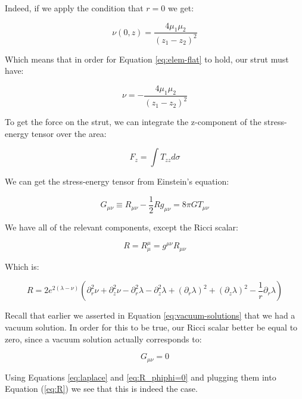 \documentclass{article}
\begin{document}
Indeed, if we apply the condition that $r=0$ we get:

\begin{equation}
\nu (0,z)=\frac{4\mu_{1}\mu_{2}}{\left(z_{1}-z_{2}\right)^{2}}\label{eq:nu_r=0}
\end{equation}

Which means that in order for Equation \eqref{eq:elem-flat} to hold, our strut must have:

\begin{equation}
\nu=-\frac{4\mu_{1}\mu_{2}}{\left(z_{1}-z_{2}\right)^{2}}
\end{equation}

To get the force on the strut, we can integrate the z-component of the stress-energy tensor over the area:

\begin{equation}
F_{z}=\int T_{zz}d\sigma
\end{equation}

We can get the stress-energy tensor from Einstein's equation:

\begin{equation}
G_{\mu\nu}\equiv R_{\mu\nu}-\frac{1}{2}Rg_{\mu\nu}=8\pi GT_{\mu\nu}\label{eq:einstein}
\end{equation}

We have all of the relevant components, except the Ricci scalar:

\begin{equation}
R=R_{\mu}^{\mu}=g^{\mu\nu}R_{\mu\nu}
\end{equation}

Which is:

\begin{equation}
R=2e^{2\left(\lambda-\nu\right)}\left(\partial^{2}_{r}\nu+\partial^{2}_{z}\nu-\partial^{2}_{r}\lambda-\partial^{2}_{z}\lambda+\left(\partial_{r}\lambda\right)^{2}+\left(\partial_{z}\lambda\right)^{2}-\frac{1}{r}\partial_{r}\lambda\right)\label{eq:R}
\end{equation}

Recall that earlier we asserted in Equation \eqref{eq:vacuum-solutions} that we had a vacuum solution. In order for this to be true, our Ricci scalar better be equal to zero, since a vacuum solution actually corresponds to:

\begin{equation}
G_{\mu\nu}=0
\end{equation}

Using Equations \eqref{eq:laplace} and \eqref{eq:R_phiphi=0} and plugging them into Equation (\ref{eq:R}) we see that this is indeed the case.
\end{document}
